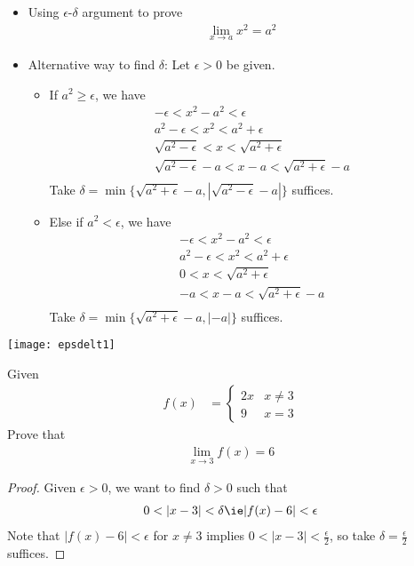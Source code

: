 \begin{itemize}
\item Using $\epsilon$-$\delta$ argument to prove
\begin{align*}
\lim_{x\to a}x^2 = a^2
\end{align*}
\item Alternative way to find $\delta$: Let $\epsilon > 0$ be given.
\begin{itemize}
\item If $a^2\geqslant\epsilon$, we have
\begin{gather*}
-\epsilon  < x^2 - a^2 < \epsilon \\
a^2 - \epsilon < x^2 < a^2 + \epsilon \\
\sqrt{a^2 - \epsilon} < x < \sqrt{a^2 + \epsilon} \\
\sqrt{a^2 - \epsilon} - a < x - a < \sqrt{a^2 + \epsilon} - a \\
\end{gather*}
Take $\delta = \min\{\sqrt{a^2 + \epsilon} - a, |\sqrt{a^2 - \epsilon} - a|\}$ suffices.
\item Else if $a^2 < \epsilon$, we have
\begin{gather*}
-\epsilon  < x^2 - a^2 < \epsilon \\
a^2 - \epsilon < x^2 < a^2 + \epsilon \\
0 < x < \sqrt{a^2 + \epsilon} \\
- a < x - a < \sqrt{a^2 + \epsilon} - a \\
\end{gather*}
Take $\delta = \min\{\sqrt{a^2 + \epsilon} - a, |-a|\}$ suffices.
\end{itemize}
\end{itemize}
\begin{fig}
\begin{center}
\texttt{[image: epsdelt1]}
\end{center}
\end{fig}
\begin{ex}
Given
\begin{align*}
f(x) &= \begin{cases}
2x & x\neq 3 \\
9 & x=3
\end{cases}
\end{align*}
Prove that
\begin{align*}
\lim_{x\to 3}f(x) = 6
\end{align*}
\begin{proof}
Given $\epsilon > 0$, we want to find $\delta > 0$ such that %
\begin{align*}
0 < |x - 3| < \delta \ie |f(x) - 6| < \epsilon
\end{align*}
Note that $|f(x) - 6| < \epsilon$ for $x\neq 3$ implies $0 < |x - 3| < \frac{\epsilon}{2}$, so take $\delta = \frac{\epsilon}{2}$ suffices.
\end{proof}
\end{ex}
